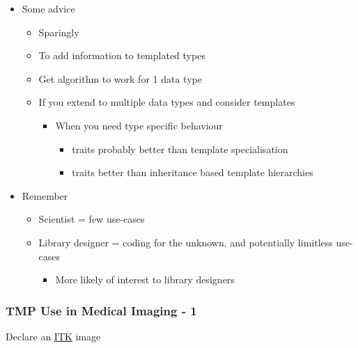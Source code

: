 \begin{itemize}
\itemsep1pt\parskip0pt
\item
  Some advice

  \begin{itemize}
  \itemsep1pt\parskip0pt
  \item
    Sparingly
  \item
    To add information to templated types
  \item
    Get algorithm to work for 1 data type
  \item
    If you extend to multiple data types and consider templates

    \begin{itemize}
    \itemsep1pt\parskip0pt
    \item
      When you need type specific behaviour

      \begin{itemize}
      \itemsep1pt\parskip0pt
      \item
        traits probably better than template specialisation
      \item
        traits better than inheritance based template hierarchies
      \end{itemize}
    \end{itemize}
  \end{itemize}
\item
  Remember

  \begin{itemize}
  \itemsep1pt\parskip0pt
  \item
    Scientist = few use-cases
  \item
    Library designer = coding for the unknown, and potentially limitless
    use-cases

    \begin{itemize}
    \itemsep1pt\parskip0pt
    \item
      More likely of interest to library designers
    \end{itemize}
  \end{itemize}
\end{itemize}

\subsubsection{TMP Use in Medical Imaging -
1}\label{tmp-use-in-medical-imaging---1}

Declare an \href{http://www.itk.org}{ITK} image

